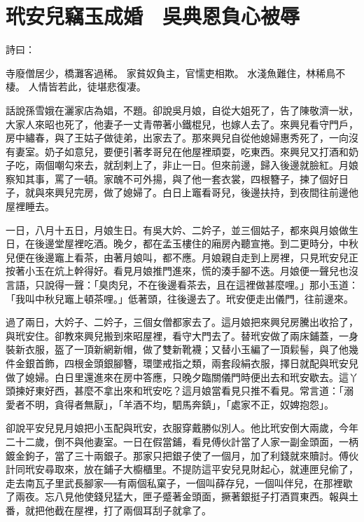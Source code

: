 %

\chapter{玳安兒竊玉成婚　吳典恩負心被辱}

\begin{showcontents}{}


詩曰：

寺廢僧居少，橋灘客過稀。
家貧奴負主，官懦吏相欺。
水淺魚難住，林稀鳥不棲。
人情皆若此，徒堪悲復凄。

話說孫雪娥在灑家店為娼，不題。卻說吳月娘，自從大姐死了，告了陳敬濟一狀，大家人來昭也死了，他妻子一丈青帶著小鐵棍兒，也嫁人去了。來興兒看守門戶，房中繡春，與了王姑子做徒弟，出家去了。那來興兒自從他媳婦惠秀死了，一向沒有妻室。奶子如意兒，要便引著孝哥兒在他屋裡頑耍，吃東西。來興兒又打酒和奶子吃，兩個嘲勾來去，就刮剌上了，非止一日。但來前邊，歸入後邊就臉紅。月娘察知其事，罵了一頓。家醜不可外揚，與了他一套衣裳，四根簪子，揀了個好日子，就與來興兒完房，做了媳婦了。白日上竈看哥兒，後邊扶持，到夜間往前邊他屋裡睡去。

一日，八月十五日，月娘生日。有吳大妗、二妗子，並三個姑子，都來與月娘做生日，在後邊堂屋裡吃酒。晚夕，都在孟玉樓住的廂房內聽宣捲。到二更時分，中秋兒便在後邊竈上看茶，由著月娘叫，都不應。月娘親自走到上房裡，只見玳安兒正按著小玉在炕上幹得好。看見月娘推門進來，慌的湊手腳不迭。月娘便一聲兒也沒言語，只說得一聲：「臭肉兒，不在後邊看茶去，且在這裡做甚麼哩。」那小玉道：「我叫中秋兒竈上頓茶哩。」低著頭，往後邊去了。玳安便走出儀門，往前邊來。

過了兩日，大妗子、二妗子，三個女僧都家去了。這月娘把來興兒房騰出收拾了，與玳安住。卻教來興兒搬到來昭屋裡，看守大門去了。替玳安做了兩床鋪蓋，一身裝新衣服，盔了一頂新網新帽，做了雙新靴襪；又替小玉編了一頂鬏髻，與了他幾件金銀首飾，四根金頭銀腳簪，環墜戒指之類，兩套段絹衣服，擇日就配與玳安兒做了媳婦。白日里還進來在房中答應，只晚夕臨關儀門時便出去和玳安歇去。這丫頭揀好東好西，甚麼不拿出來和玳安吃？這月娘當看見只推不看見。常言道：「溺愛者不明，貪得者無厭」，「羊酒不均，駟馬奔鎮」，「處家不正，奴婢抱怨」。

卻說平安兒見月娘把小玉配與玳安，衣服穿戴勝似別人。他比玳安倒大兩歲，今年二十二歲，倒不與他妻室。一日在假當鋪，看見傅伙計當了人家一副金頭面，一柄鍍金鉤子，當了三十兩銀子。那家只把銀子使了一個月，加了利錢就來贖討。傅伙計同玳安尋取來，放在鋪子大櫥櫃里。不提防這平安兒見財起心，就連匣兒偷了，走去南瓦子里武長腳家──有兩個私窠子，一個叫薛存兒，一個叫伴兒，在那裡歇了兩夜。忘八見他使錢兒猛大，匣子蹙著金頭面，撅著銀挺子打酒買東西。報與土番，就把他截在屋裡，打了兩個耳刮子就拿了。


\end{showcontents}
